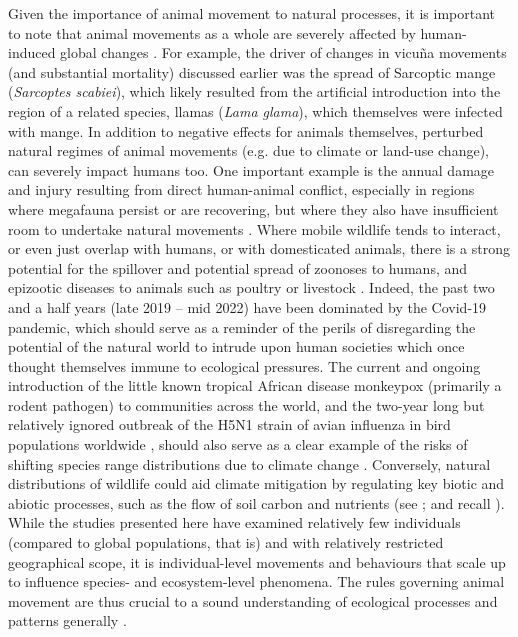 Given the importance of animal movement to natural processes, it is important to note that animal movements as a whole are severely affected by human-induced global changes \parencite{tucker2018}.
For example, the driver of changes in vicu\~na movements (and substantial mortality) discussed earlier \parencite{monk2022} was the spread of Sarcoptic mange (\emph{Sarcoptes scabiei}), which likely resulted from the artificial introduction into the region of a related species, llamas (\emph{Lama glama}), which themselves were infected with mange.
In addition to negative effects for animals themselves, perturbed natural regimes of animal movements (e.g. due to climate or land-use change), can severely impact humans too.
One important example is the annual damage and injury resulting from direct human-animal conflict, especially in regions where megafauna persist or are recovering, but where they also have insufficient room to undertake natural movements \citep{abrahms2021}.
Where mobile wildlife tends to interact, or even just overlap with humans, or with domesticated animals, there is a strong potential for the spillover and potential spread of zoonoses to humans, and epizootic diseases to animals such as poultry or livestock \citep{carlson2022a,wille2022}.
Indeed, the past two and a half years (late 2019 -- mid 2022) have been dominated by the Covid-19 pandemic, which should serve as a reminder of the perils of disregarding the potential of the natural world to intrude upon human societies which once thought themselves immune to ecological pressures.
The current and ongoing introduction of the little known tropical African disease monkeypox (primarily a rodent pathogen) to communities across the world, and the two-year long but relatively ignored outbreak of the H5N1 strain of avian influenza in bird populations worldwide \parencite{wille2022}, should also serve as a clear example of the risks of shifting species range distributions due to climate change \parencite{carlson2022}.
Conversely, natural distributions of wildlife could aid climate mitigation by regulating key biotic and abiotic processes, such as the flow of soil carbon and nutrients (see \cite{schmitz2018,malhi2022}; and recall \cite{leroux2018}).
While the studies presented here have examined relatively few individuals (compared to global populations, that is) and with relatively restricted geographical scope, it is individual-level movements and behaviours that scale up to influence species- and ecosystem-level phenomena.
The rules governing animal movement are thus crucial to a sound understanding of ecological processes and patterns generally \citep{jeltsch2013,schlagel2020,costa-pereira2022}.

